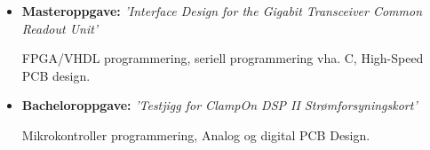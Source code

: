 \documentclass[11pt,a4paper,sans,norsk]{moderncv}        %
\begin{document}
\begin{itemize}

\item{\textbf{Masteroppgave:} \textit{'Interface Design for the Gigabit Transceiver Common Readout Unit'}

\vspace{3pt}

FPGA/VHDL programmering, seriell programmering vha. C, High-Speed PCB design.

}
\vspace{6pt}

\item{\textbf{Bacheloroppgave:} \textit{'Testjigg for ClampOn DSP II Strømforsyningskort'}

\vspace{3pt}

Mikrokontroller programmering, Analog og digital PCB Design. 

}
\end{itemize}
\end{document}
